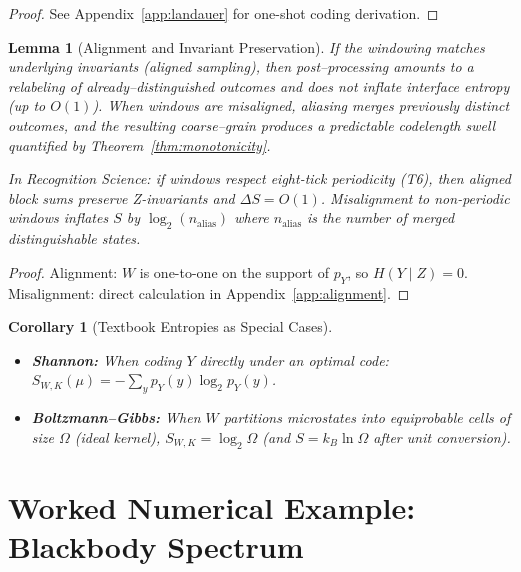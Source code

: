 \documentclass[11pt,letterpaper]{article}
\newtheorem{lemma}[theorem]{Lemma}
\newtheorem{corollary}[theorem]{Corollary}
\theoremstyle{definition}
\theoremstyle{remark}
\begin{document}
\begin{proof}
See Appendix~\ref{app:landauer} for one-shot coding derivation.
\end{proof}

\begin{lemma}[Alignment and Invariant Preservation]\label{lem:alignment}
If the windowing matches underlying invariants (aligned sampling), then post--processing amounts to a relabeling of already--distinguished outcomes and does not inflate interface entropy (up to \(O(1)\)). When windows are misaligned, aliasing merges previously distinct outcomes, and the resulting coarse--grain produces a predictable codelength swell quantified by Theorem~\ref{thm:monotonicity}.

In Recognition Science: if windows respect eight-tick periodicity (T6), then aligned block sums preserve Z-invariants and \(\Delta S = O(1)\). Misalignment to non-periodic windows inflates \(S\) by \(\log_2(n_{\text{alias}})\) where \(n_{\text{alias}}\) is the number of merged distinguishable states.
\end{lemma}

\begin{proof}
Alignment: \(W\) is one-to-one on the support of \(p_Y\), so \(H(Y\mid Z)=0\). Misalignment: direct calculation in Appendix~\ref{app:alignment}.
\end{proof}

\begin{corollary}[Textbook Entropies as Special Cases]\label{cor:special_cases}
\begin{itemize}[leftmargin=*]
  \item \textbf{Shannon:} When coding \(Y\) directly under an optimal code: \(S_{W,K}(\mu)= -\sum_y p_Y(y)\log_2 p_Y(y)\).
  \item \textbf{Boltzmann--Gibbs:} When \(W\) partitions microstates into equiprobable cells of size \(\Omega\) (ideal kernel), \(S_{W,K}=\log_2\Omega\) (and \(S=k_B\ln \Omega\) after unit conversion).
\end{itemize}
\end{corollary}

\section{Worked Numerical Example: Blackbody Spectrum}
\end{document}
